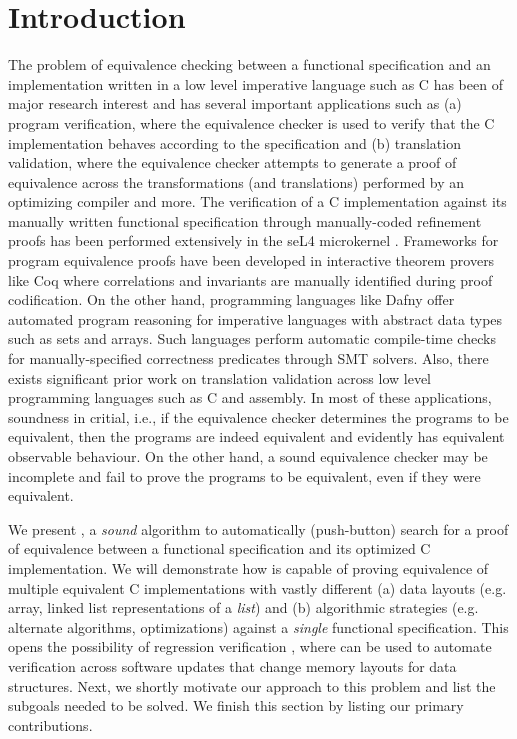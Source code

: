 \section{Introduction}
\label{sec:intro}
The problem of equivalence checking between a functional specification and an
implementation written in a low level imperative language such as C
has been of major research interest
and has several important applications such as (a) program verification, where
the equivalence checker is used to verify that the C implementation
behaves according to the specification and (b) translation validation, where
the equivalence checker attempts to generate a proof of equivalence across
the transformations (and translations) performed by an optimizing compiler
and more. The verification of a C implementation against its manually written
functional specification through manually-coded refinement proofs has been
performed extensively in the seL4 microkernel \cite{seL4}.
Frameworks for program equivalence proofs have been developed in interactive
theorem provers like Coq \cite{programEquivalenceInCoq} where correlations and invariants
are manually identified during proof codification.
On the other hand, programming languages like Dafny \cite{dafny} offer automated program
reasoning for imperative languages with abstract data types such as sets and arrays.
Such languages perform automatic compile-time checks for manually-specified
correctness predicates through SMT solvers.
Also, there exists significant prior work on translation validation
\cite{tvi,tristan_tv_eqsat11,stepp_eqsat_llvm11,eqsat,pec,zuck03,zuck05,heffter05,covac,c_to_verilog,kanade09,lopes16,tvoc_cav05,ddec,semalign,oopsla20,tv_oskernel,namjoshi13}
across low level programming languages such as C and assembly.
In most of these applications, soundness in critial,
i.e., if the equivalence checker determines the programs to be equivalent, then the programs are indeed equivalent
and evidently has equivalent observable behaviour. On the other hand, a sound equivalence checker may be incomplete
and fail to prove the programs to be equivalent, even if they were equivalent.

We present \toolName{}, a {\em sound} algorithm to automatically (push-button) search
for a proof of equivalence between a functional specification and its
optimized C implementation. We will demonstrate how \toolName{} is capable of
proving equivalence of multiple equivalent C implementations with vastly
different (a) data layouts (e.g. array, linked list representations of a {\em list})
and (b) algorithmic strategies (e.g. alternate algorithms, optimizations) against
a {\em single} functional specification.
This opens the possibility of regression verification \cite{strichman_regressverify,felsing14},
where \toolName{} can be used to automate verification across
software updates that change memory layouts for data structures.
Next, we shortly motivate our approach to this problem and list the subgoals needed to be solved.
We finish this section by listing our primary contributions.

